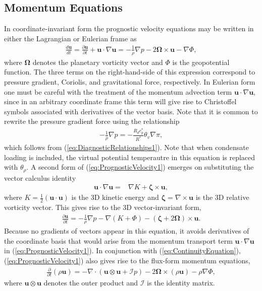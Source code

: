 \documentclass[gmd, manuscript]{copernicus}
\newcommand{\vb}{\mathbf}
\newcommand{\vg}{\boldsymbol}
\newcommand{\diff}[2]{\frac{d #1}{d #2}}
\newcommand{\pdiff}[2]{\frac{\partial #1}{\partial #2}}
\providecommand{\DIFadd}[1]{{\protect\color{blue}\uwave{#1}}} %
\providecommand{\DIFaddbegin}{} %
\providecommand{\DIFaddend}{} %
\begin{document}
\subsection{Momentum Equations}

In coordinate-invariant form the prognostic velocity equations may be written in either the Lagrangian or Eulerian frame as
\begin{align} \label{eq:PrognosticVelocity1}
\diff{\vb{u}}{t} = \pdiff{\vb{u}}{t} + \vb{u} \cdot \nabla \vb{u} = - \frac{1}{\rho} \nabla p - 2 \vg{\Omega} \times \vb{u} - \nabla \Phi,
\end{align} where $\vg{\Omega}$ denotes the planetary vorticity vector and $\Phi$ is the geopotential function.  The three terms on the right-hand-side of this expression correspond to pressure gradient, Coriolis, and gravitational force, respectively.  In Eulerian form one must be careful with the treatment of the momentum advection term $\vb{u} \cdot \nabla \vb{u}$, since in an arbitrary coordinate frame this term will give rise to Christoffel symbols associated with derivatives of the vector basis.  Note that it is common to rewrite the pressure gradient force using the relationship
\begin{align} \label{eq:PressureGradientForceAlt}
- \frac{1}{\rho} \nabla p = - \frac{R_d c_p^\ast}{R^\ast} \theta_v \nabla \pi,
\end{align} which follows from (\ref{eq:DiagnosticRelationships1}).  Note that when condensate loading is included, the virtual potential temperautre in this equation is replaced with $\theta_\rho$.  A second form of (\ref{eq:PrognosticVelocity1}) emerges on substituting the vector calculus identity
\begin{align}
\vb{u} \cdot \nabla \vb{u} =& \nabla K + \vg{\zeta} \times \vb{u},
\end{align} where $K = \frac{1}{2} (\vb{u} \cdot \vb{u})$ is the 3D \DIFaddbegin \DIFadd{specific }\DIFaddend kinetic energy and $\vg{\zeta} = \nabla \times \vb{u}$ is the 3D relative vorticity vector.  This gives rise to the 3D vector-invariant form,
\begin{align} \label{eq:PrognosticVelocity2}
\pdiff{\vb{u}}{t} = - \frac{1}{\rho} \nabla p - \nabla (K + \Phi) - (\vg{\zeta} + 2 \vg{\Omega}) \times \vb{u}. 
\end{align}  Because no gradients of vectors appear in this equation, it avoids derivatives of the coordinate basis  that would arise from the momentum transport term $\vb{u} \cdot \nabla \vb{u}$ in (\ref{eq:PrognosticVelocity1}).  In conjunction with (\ref{eq:ContinuityEquation}), (\ref{eq:PrognosticVelocity1}) also gives rise to the flux-form momentum equations,
\begin{align} \label{eq:PrognosticVelocityFluxForm}
\pdiff{}{t} (\rho \vb{u}) = - \nabla \cdot (\vb{u} \otimes \vb{u} + \mathcal{I} p) - 2 \vg{\Omega} \times (\rho \vb{u}) - \rho \nabla \Phi,
\end{align} where $\vb{u} \otimes \vb{u}$ denotes the outer product and $\mathcal{I}$ is the identity matrix.
\end{document}
